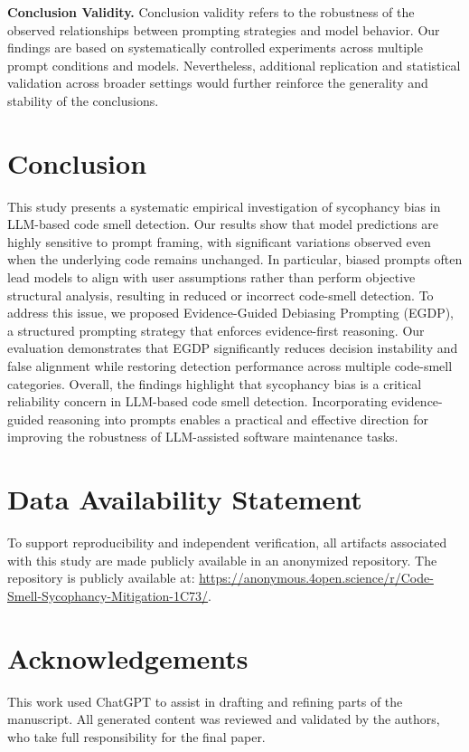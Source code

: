 \documentclass[sigconf,review,anonymous]{acmart}
\begin{document}
\textbf{Conclusion Validity.}
Conclusion validity refers to the robustness of the observed relationships between prompting strategies and model behavior. Our findings are based on systematically controlled experiments across multiple prompt conditions and models. Nevertheless, additional replication and statistical validation across broader settings would further reinforce the generality and stability of the conclusions.

\section{Conclusion}

This study presents a systematic empirical investigation of sycophancy bias in LLM-based code smell detection. Our results show that model predictions are highly sensitive to prompt framing, with significant variations observed even when the underlying code remains unchanged. In particular, biased prompts often lead models to align with user assumptions rather than perform objective structural analysis, resulting in reduced or incorrect code-smell detection. To address this issue, we proposed Evidence-Guided Debiasing Prompting (EGDP), a structured prompting strategy that enforces evidence-first reasoning. Our evaluation demonstrates that EGDP significantly reduces decision instability and false alignment while restoring detection performance across multiple code-smell categories. Overall, the findings highlight that sycophancy bias is a critical reliability concern in LLM-based code smell detection. Incorporating evidence-guided reasoning into prompts enables a practical and effective direction for improving the robustness of LLM-assisted software maintenance tasks.

\section{Data Availability Statement}

To support reproducibility and independent verification, all artifacts associated with this study are made publicly available in an anonymized repository. The repository is publicly available at:
\url{https://anonymous.4open.science/r/Code-Smell-Sycophancy-Mitigation-1C73/}.

\section{Acknowledgements}

This work used ChatGPT to assist in drafting and refining parts of the manuscript. All generated content was reviewed and validated by the authors, who take full responsibility for the final paper.




\end{document}
